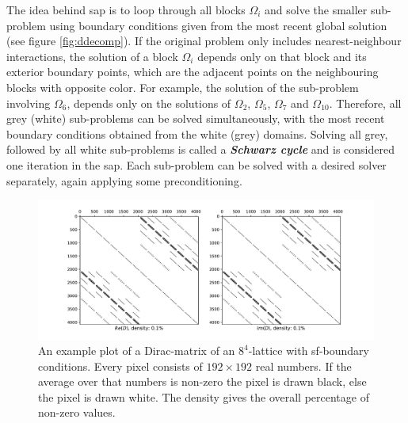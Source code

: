 \documentclass{article}
\theoremstyle{plain} %
\theoremstyle{convention} %
\theoremstyle{remark} %
\def\df#1{\textbf{\textit{#1}}}
\numberwithin{equation}{section}
\begin{document}
The idea behind \acrlong{sap} is to loop through all blocks $\Omega_i$ and solve the smaller sub-problem using boundary conditions given from the most recent global solution (see figure \ref{fig:ddecomp}). If the original problem only includes nearest-neighbour interactions, the solution of a block $\Omega_i$ depends only on that block and its exterior boundary points, which are the adjacent points on the neighbouring blocks with opposite color. For example, the solution of the sub-problem involving $\Omega_6$, depends only on the solutions of $\Omega_2$, $\Omega_5$, $\Omega_7$ and $\Omega_{10}$\footnotemark.
Therefore, all grey (white) sub-problems can be solved simultaneously, with the most recent boundary conditions obtained from the white (grey) domains. Solving all grey, followed by all white sub-problems is called a \df{Schwarz cycle} and is considered one iteration in the \acrshort{sap}. Each sub-problem can be solved with a desired solver separately, again applying some preconditioning\footnotemark.

\begin{figure}[h]
    \centering
    \includegraphics[width=1.0\textwidth]{plots/dirac_matrix6}
    \caption{An example plot of a Dirac-matrix of an $8^4$-lattice with \acrshort{sf}-boundary conditions. Every pixel consists of $192 \times 192$ real numbers. If the average over that numbers is non-zero the pixel is drawn black, else the pixel is drawn white. The density gives the overall percentage of non-zero values.}
    \label{fig:dirac_matrix}
\end{figure}
\end{document}
